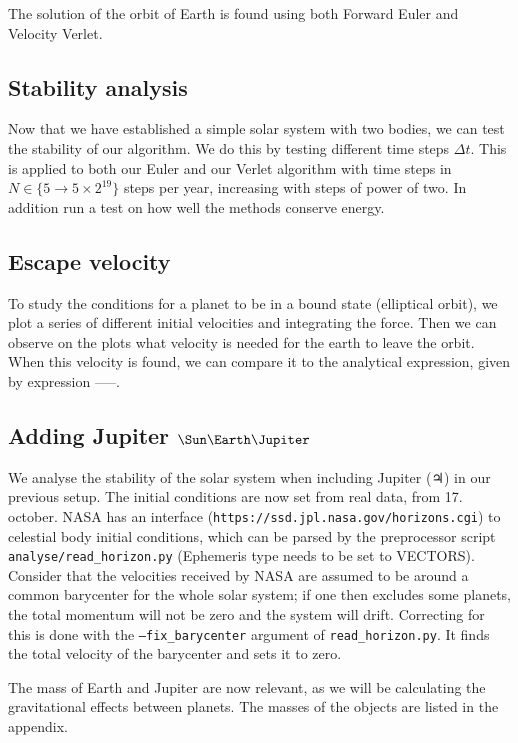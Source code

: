 \documentclass[10pt]{article}
\begin{document}
\begin{multicols}{2}
The solution of the orbit of Earth is found using both Forward Euler and
Velocity Verlet. 

\subsection{Stability analysis}
Now that we have established a simple solar system with two bodies, we can
test the stability of our algorithm. We do this by testing different time
steps $\Delta t$. This is applied to both our Euler and our Verlet
algorithm with time steps in $N \in \{5 \to 5 \times 2^{19}\}$ steps per year,
increasing with steps of power of two. In addition run a test on how well the
methods conserve energy.

\subsection{Escape velocity}
To study the conditions for a planet to be in a bound state (elliptical orbit), we plot a series of different initial velocities and integrating the force. Then we can observe on the plots what velocity is needed for the earth to leave the orbit. When this velocity is found, we can compare it to the analytical expression, given by expression -----. 

\subsection{Adding Jupiter \texorpdfstring{$\Sun\Earth\Jupiter$}{}}
We analyse the stability of the solar system when including Jupiter
($\Jupiter$) in our previous setup.  The initial
conditions are now set from real data, from 17. october. NASA has an interface
(\texttt{https://ssd.jpl.nasa.gov/horizons.cgi}) to celestial body initial
conditions, which can be parsed by the preprocessor script
\texttt{analyse/read\_horizon.py} (Ephemeris type needs to be set to
VECTORS).  Consider that the velocities received by NASA are assumed to be
around a common barycenter for the whole solar system; if one then excludes
some planets, the total momentum will not be zero and the system will
drift.  Correcting for this is done with the \texttt{--fix\_barycenter}
argument of \texttt{read\_horizon.py}. It finds the total velocity of the
barycenter and sets it to zero.

The mass of Earth and Jupiter are now relevant, as we will be calculating the
gravitational effects between planets.  The masses of the objects are
listed in the appendix.


\end{multicols}
\end{document}
